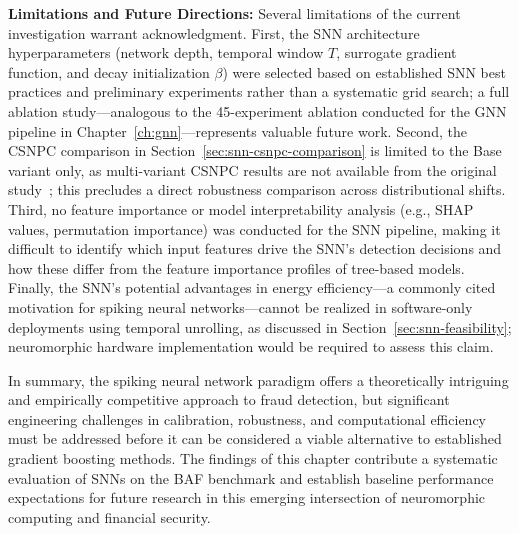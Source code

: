 \textbf{Limitations and Future Directions:} Several limitations of the current investigation warrant acknowledgment. First, the SNN architecture hyperparameters (network depth, temporal window $T$, surrogate gradient function, and decay initialization $\beta$) were selected based on established SNN best practices and preliminary experiments rather than a systematic grid search; a full ablation study---analogous to the 45-experiment ablation conducted for the GNN pipeline in Chapter~\ref{ch:gnn}---represents valuable future work. Second, the CSNPC comparison in Section~\ref{sec:snn-csnpc-comparison} is limited to the Base variant only, as multi-variant CSNPC results are not available from the original study~\cite{farahat2025objective}; this precludes a direct robustness comparison across distributional shifts. Third, no feature importance or model interpretability analysis (e.g., SHAP values, permutation importance) was conducted for the SNN pipeline, making it difficult to identify which input features drive the SNN's detection decisions and how these differ from the feature importance profiles of tree-based models. Finally, the SNN's potential advantages in energy efficiency---a commonly cited motivation for spiking neural networks---cannot be realized in software-only deployments using temporal unrolling, as discussed in Section~\ref{sec:snn-feasibility}; neuromorphic hardware implementation would be required to assess this claim.

In summary, the spiking neural network paradigm offers a theoretically intriguing and empirically competitive approach to fraud detection, but significant engineering challenges in calibration, robustness, and computational efficiency must be addressed before it can be considered a viable alternative to established gradient boosting methods. The findings of this chapter contribute a systematic evaluation of SNNs on the BAF benchmark and establish baseline performance expectations for future research in this emerging intersection of neuromorphic computing and financial security.
